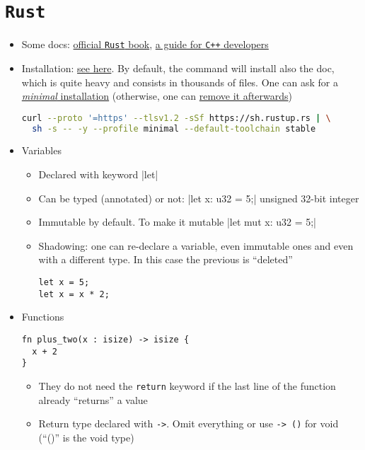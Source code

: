 \documentclass[a4paper,12pt,%
              final%
              ]{article}
\begin{document}
\section{\texttt{Rust}}
\label{sec:rust}
\begin{itemize}
  \item Some docs: \href{https://doc.rust-lang.org/book/title-page.html}{official \texttt{Rust} book}, \href{https://github.com/nrc/r4cppp/tree/master}{a guide for \texttt{C++} developers}
  \item Installation: \href{https://www.rust-lang.org/tools/install}{see here}. By default, the command will install also the doc, which is quite heavy and consists in thousands of files. One can ask for a \href{https://github.com/rust-lang/rustup/issues/998#issuecomment-542332509}{\emph{minimal} installation} (otherwise, one can \href{https://github.com/rust-lang/rustup/issues/998#issuecomment-542363707}{remove it afterwards})
\begin{lstlisting}[language=bash]
curl --proto '=https' --tlsv1.2 -sSf https://sh.rustup.rs | \
  sh -s -- -y --profile minimal --default-toolchain stable
\end{lstlisting}
  \item Variables
    \begin{itemize}
      \item Declared with keyword |let|
      \item Can be typed (annotated) or not: |let x: u32 = 5;| unsigned 32-bit integer
      \item Immutable by default. To make it mutable \mint{Rust}|let mut x: u32 = 5;|
      \item Shadowing: one can re-declare a variable, even immutable ones and even with a different type. In this case the previous is ``deleted''
\begin{verbatim}
let x = 5;
let x = x * 2;
\end{verbatim}
    \end{itemize}
  \item Functions
\begin{verbatim}
fn plus_two(x : isize) -> isize {
  x + 2
}
\end{verbatim}
    \begin{itemize}
      \item They do not need the \texttt{return} keyword if the last line of the function already ``returns'' a value
      \item Return type declared with \texttt{->}. Omit everything or use \texttt{-> ()} for void (``()'' is the void type)

\end{itemize}
\end{itemize}
\end{document}

